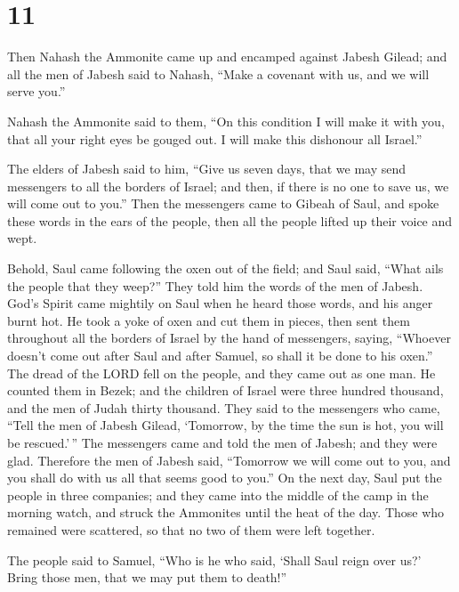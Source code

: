 \hypertarget{section-10}{%
\section{11}\label{section-10}}

 Then Nahash the Ammonite came up and encamped against
Jabesh Gilead; and all the men of Jabesh said to Nahash, ``Make a
covenant with us, and we will serve you.''

 Nahash the Ammonite said to them, ``On this condition I
will make it with you, that all your right eyes be gouged out. I will
make this dishonour all Israel.''

 The elders of Jabesh said to him, ``Give us seven days,
that we may send messengers to all the borders of Israel; and then, if
there is no one to save us, we will come out to you.''  Then
the messengers came to Gibeah of Saul, and spoke these words in the ears
of the people, then all the people lifted up their voice and wept.

 Behold, Saul came following the oxen out of the field; and
Saul said, ``What ails the people that they weep?'' They told him the
words of the men of Jabesh.  God's Spirit came mightily on
Saul when he heard those words, and his anger burnt hot.  He
took a yoke of oxen and cut them in pieces, then sent them throughout
all the borders of Israel by the hand of messengers, saying, ``Whoever
doesn't come out after Saul and after Samuel, so shall it be done to his
oxen.'' The dread of the LORD fell on the people, and they came out as
one man.  He counted them in Bezek; and the children of
Israel were three hundred thousand, and the men of Judah thirty
thousand.  They said to the messengers who came, ``Tell the
men of Jabesh Gilead, `Tomorrow, by the time the sun is hot, you will be
rescued.'\,'' The messengers came and told the men of Jabesh; and they
were glad.  Therefore the men of Jabesh said, ``Tomorrow we
will come out to you, and you shall do with us all that seems good to
you.''  On the next day, Saul put the people in three
companies; and they came into the middle of the camp in the morning
watch, and struck the Ammonites until the heat of the day. Those who
remained were scattered, so that no two of them were left together.

 The people said to Samuel, ``Who is he who said, `Shall
Saul reign over us?' Bring those men, that we may put them to death!''

